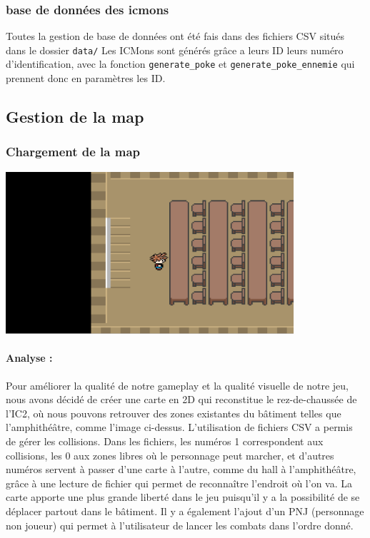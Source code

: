 \documentclass[12pt,a4paper, twoside]{article}
\begin{document}
    \subsubsection{base de données des icmons}
    Toutes la gestion de base de données ont été fais dans des fichiers CSV situés dans le dossier \texttt{data/}
    Les ICMons sont générés grâce a leurs ID leurs numéro d'identification, avec la fonction \texttt{generate\_poke} et \texttt{generate\_poke\_ennemie} qui prennent donc en paramètres les ID.

      
\newpage
\subsection{Gestion de la map}

    \subsubsection{Chargement de la map}
    \includegraphics[width=0.8\textwidth]{../docs/img/screenshots/screen2.png}
    \newline
    \paragraph{Analyse : }
   
    Pour améliorer la qualité de notre gameplay et la qualité visuelle de notre jeu, nous avons décidé de créer une carte en 2D qui reconstitue le rez-de-chaussée de l'IC2, où nous pouvons retrouver des
    zones existantes du bâtiment telles que l'amphithéâtre, comme l'image ci-dessus. L'utilisation de fichiers CSV a permis de gérer les collisions. Dans les fichiers, les numéros 1 correspondent 
    aux collisions, les 0 aux zones libres où le personnage peut marcher, et d'autres numéros servent à passer d'une carte à l'autre, comme du hall à l'amphithéâtre, grâce à une lecture de fichier qui permet
    de reconnaître l'endroit où l'on va. La carte apporte une plus grande liberté dans le jeu puisqu'il y a la possibilité de se déplacer partout dans le bâtiment. Il y a également l'ajout d'un PNJ
    (personnage non joueur) qui permet à l'utilisateur de lancer les combats dans l'ordre donné. 
    \newline
\end{document}
